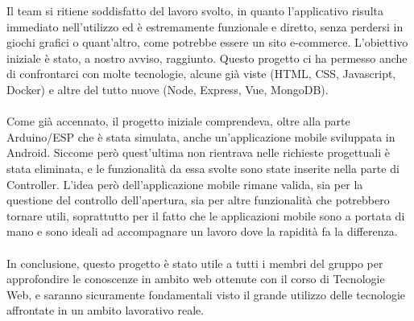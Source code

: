 \documentclass[a4paper,12pt]{report}
\begin{document}
Il team si ritiene soddisfatto del lavoro svolto, in quanto l'applicativo risulta immediato nell'utilizzo ed è estremamente funzionale e diretto, senza perdersi in giochi grafici o quant'altro, come potrebbe essere un sito e-commerce. L'obiettivo iniziale è stato, a nostro avviso, raggiunto. Questo progetto ci ha permesso anche di confrontarci con molte tecnologie, alcune già viste (HTML, CSS, Javascript, Docker) e altre del tutto nuove (Node, Express, Vue, MongoDB).\\\\
Come già accennato, il progetto iniziale comprendeva, oltre alla parte Arduino/ESP che è stata simulata, anche un'applicazione mobile sviluppata in Android. Siccome però quest'ultima non rientrava nelle richieste progettuali è stata eliminata, e le funzionalità da essa svolte sono state inserite nella parte di Controller. L'idea però dell'applicazione mobile rimane valida, sia per la questione del controllo dell'apertura, sia per altre funzionalità che potrebbero tornare utili, soprattutto per il fatto che le applicazioni mobile sono a portata di mano e sono ideali ad accompagnare un lavoro dove la rapidità fa la differenza.\\\\
In conclusione, questo progetto è stato utile a tutti i membri del gruppo per approfondire le conoscenze in ambito web ottenute con il corso di Tecnologie Web, e saranno sicuramente fondamentali visto il grande utilizzo delle tecnologie affrontate in un ambito lavorativo reale.
\end{document}
